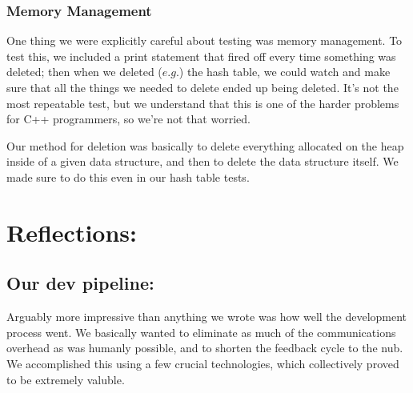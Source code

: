 \documentclass[a4paper]{article}
\begin{document}
\subsubsection*{Memory Management}

One thing we were explicitly careful about testing was memory management. To test this, we included a print statement that fired off every time something was deleted; then when we deleted ($\textit{e.g.}$) the hash table, we could watch and make sure that all the things we needed to delete ended up being deleted. It's not the most repeatable test, but we understand that this is one of the harder problems for C++ programmers, so we're not that worried.

Our method for deletion was basically to delete everything allocated on the heap inside of a given data structure, and then to delete the data structure itself. We made sure to do this even in our hash table tests.

\section{Reflections:}

\subsection*{Our dev pipeline:}

Arguably more impressive than anything we wrote was how well the development process went. We basically wanted to eliminate as much of the communications overhead as was humanly possible, and to shorten the feedback cycle to the nub. We accomplished this using a few crucial technologies, which collectively proved to be extremely valuble.
\end{document}
